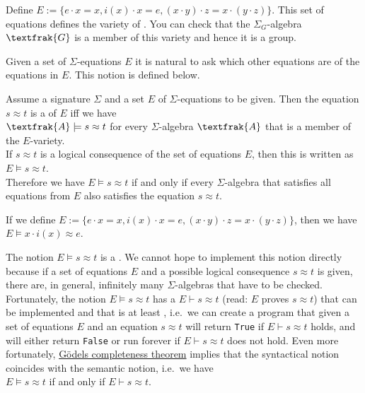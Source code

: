 \example
Define $E := \bigl\{ e \cdot x = x, i(x) \cdot x = e, (x \cdot y) \cdot z = x \cdot (y \cdot z) \bigr\}$.
This set of equations defines the variety of .  You can check that the $\Sigma_G$-algebra
$\textfrak{G}$ is a member of this variety and hence it is a group.  
\eoxs

Given a set of $\Sigma$-equations $E$ it is natural to ask which other equations are  of
the equations in $E$.  This notion is defined below. 

\begin{Definition}
  Assume a signature $\Sigma$ and a set $E$ of $\Sigma$-equations to be given.
  Then the equation $s \approx t$ is a  of $E$ iff we have
  \\[0.2cm]
  \hspace*{1.3cm}
  $\textfrak{A} \models s \approx t$ \quad for every $\Sigma$-algebra $\textfrak{A}$ that is a member of the $E$-variety.
  \\[0.2cm]
  If $s \approx t$ is a logical consequence of the set of equations $E$, then this is written as
  \\[0.2cm]
  \hspace*{1.3cm}
  $E \models s \approx t$.
  \\[0.2cm]
  Therefore we have $E \models s \approx t$ if and only if every $\Sigma$-algebra that satisfies all equations
  from $E$ also satisfies the equation $s \approx t$. \eoxs
\end{Definition}

\example
If we define $E := \bigl\{ e \cdot x = x, i(x) \cdot x = e, (x \cdot y) \cdot z = x \cdot (y \cdot z) \bigr\}$,
then we have
\\[0.2cm]
\hspace*{1.3cm}
$E \models x \cdot i(x) \approx e$.  \eox

The notion $E \models s \approx t$ is a .  We cannot hope to implement this notion directly
because if a set of equations $E$ and a possible logical consequence $s \approx t$ is given, there are, in
general, infinitely many $\Sigma$-algebras that have to be checked.  Fortunately, the notion 
$E \models s \approx t$ has a  $E \vdash s \approx t$ (read: $E$ proves $s \approx t$)
that can be implemented and that is at least , i.e.~we can create a program that given 
a set of equations $E$ and an equation $s \approx t$ will return \texttt{True} if $E \vdash s \approx t$ holds, and will
either return \texttt{False} or run forever if $E \vdash s \approx t$ does not hold.  Even more fortunately,
\href{https://en.wikipedia.org/wiki/Gödel%27s_completeness_theorem}{G\"{o}dels completeness theorem} 
implies that the syntactical notion coincides with the semantic notion, i.e.~we have
\\[0.2cm]
\hspace*{1.3cm}
$E \models s \approx t$ \quad if and only if \quad $E \vdash s \approx t$.

